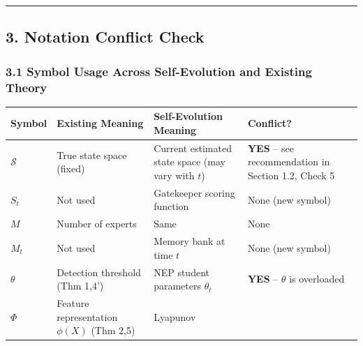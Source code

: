\documentclass[
  12pt,
]{ctexart}
\begin{document}
\begin{center}\rule{0.5\linewidth}{0.5pt}\end{center}

\subsection{3. Notation Conflict Check}\label{notation-conflict-check}

\subsubsection{3.1 Symbol Usage Across Self-Evolution and Existing
Theory}\label{symbol-usage-across-self-evolution-and-existing-theory}

\begin{longtable}[]{@{}
  >{\raggedright\arraybackslash}p{}
  >{\raggedright\arraybackslash}p{}
  >{\raggedright\arraybackslash}p{}
  >{\raggedright\arraybackslash}p{}@{}}
\toprule\noalign{}
\begin{minipage}[b]{\linewidth}\raggedright
Symbol
\end{minipage} & \begin{minipage}[b]{\linewidth}\raggedright
Existing Meaning
\end{minipage} & \begin{minipage}[b]{\linewidth}\raggedright
Self-Evolution Meaning
\end{minipage} & \begin{minipage}[b]{\linewidth}\raggedright
Conflict?
\end{minipage} \\
\midrule\noalign{}
\endhead
\bottomrule\noalign{}
\endlastfoot
\(\mathcal{S}\) & True state space (fixed) & Current estimated state
space (may vary with \(t\)) & \textbf{YES} -- see recommendation in
Section 1.2, Check 5 \\
\(S_t\) & Not used & Gatekeeper scoring function & None (new symbol) \\
\(M\) & Number of experts & Same & None \\
\(M_t\) & Not used & Memory bank at time \(t\) & None (new symbol) \\
\(\theta\) & Detection threshold (Thm 1,4') & NEP student parameters
\(\theta_t\) & \textbf{YES} -- \(\theta\) is overloaded \\
\(\Phi\) & Feature representation \(\phi(X)\) (Thm 2,5) & Lyapunov

\end{longtable}
\end{document}
